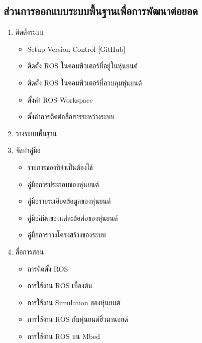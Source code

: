\subsection{ส่วนการออกแบบระบบพื้นฐานเพื่อการพัฒนาต่อยอด}
\begin{enumerate}[label=\arabic*, leftmargin=1.5cm]
	
	\item ติดตั้งระบบ\vspace{-3mm}
	\begin{itemize}\setlength\itemsep{-0.3em}
		\item Setup Version Control [GitHub]
		\item ติดตั้ง ROS ในคอมพิวเตอร์ที่อยู่ในหุ่นยนต์
		\item ติดตั้ง ROS ในคอมพิวเตอร์ที่ควบคุมหุ่นยนต์
		\item ตั้งค่า ROS Workspace
		\item ตั้งค่าการติดต่อสื่อสารระหว่างระบบ
	\end{itemize}
	\item วางระบบพื้นฐาน\vspace{-3mm}
	\item จัดทำคู่มือ\vspace{-3mm}
	\begin{itemize}\setlength\itemsep{-0.3em}
		\item รายการของที่จำเป็นต้องใช้
		\item คู่มือการประกอบของหุ่นยนต์
		\item คู่มือรายระเอียดข้อมูลของหุ่นยนต์
		\item คู่มือลิมิตของแต่ละข้อต่อของหุ่นยนต์
		\item คู่มือการวางโครงสร้างของระบบ
	\end{itemize}
	\item สื่อการสอน\vspace{-3mm}
	\begin{itemize}\setlength\itemsep{-0.3em}
		\item การติดตั้ง ROS
		\item การใช้งาน ROS เบื้องต้น
		\item การใช้งาน Simulation ของหุ่นยนต์
		\item การใช้งาน ROS กับหุ่นยนต์ฮิวมานอยด์
		\item การใช้งาน ROS บน Mbed
	\end{itemize}
	
\end{enumerate}

